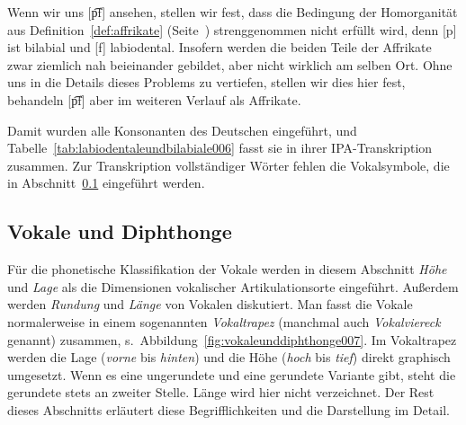 Wenn wir uns [p͡f] ansehen, stellen wir fest, dass die Bedingung der Homorganität aus Definition~\ref{def:affrikate} (Seite~\pageref{def:affrikate}) strenggenommen nicht erfüllt wird, denn [p] ist bilabial und [f] labiodental.
Insofern werden die beiden Teile der Affrikate zwar ziemlich nah beieinander gebildet, aber nicht wirklich am selben Ort.
Ohne uns in die Details dieses Problems zu vertiefen, stellen wir dies hier fest, behandeln [p͡f] aber im weiteren Verlauf als Affrikate.

Damit wurden alle Konsonanten des Deutschen eingeführt, und Tabelle~\ref{tab:labiodentaleundbilabiale006} fasst sie in ihrer IPA-Transkription zusammen.
Zur Transkription vollständiger Wörter fehlen die Vokalsymbole, die in Abschnitt~\ref{sec:vokaleunddiphthonge} eingeführt werden.

\subsection{Vokale und Diphthonge}
\label{sec:vokaleunddiphthonge}

Für die phonetische Klassifikation der Vokale werden in diesem Abschnitt \textit{Höhe} und \textit{Lage} als die Dimensionen vokalischer Artikulationsorte eingeführt.
Außerdem werden \textit{Rundung} und \textit{Länge} von Vokalen diskutiert.
Man fasst die Vokale normalerweise in einem sogenannten \textit{Vokaltrapez} (manchmal auch \textit{Vokalviereck} genannt) zusammen, s.\ Abbildung~\ref{fig:vokaleunddiphthonge007}.
Im Vokaltrapez werden die Lage (\textit{vorne} bis \textit{hinten}) und die Höhe (\textit{hoch} bis \textit{tief}) direkt graphisch umgesetzt.
Wenn es eine ungerundete und eine gerundete Variante gibt, steht die gerundete stets an zweiter Stelle.
Länge wird hier nicht verzeichnet.
Der Rest dieses Abschnitts erläutert diese Begrifflichkeiten und die Darstellung im Detail.

